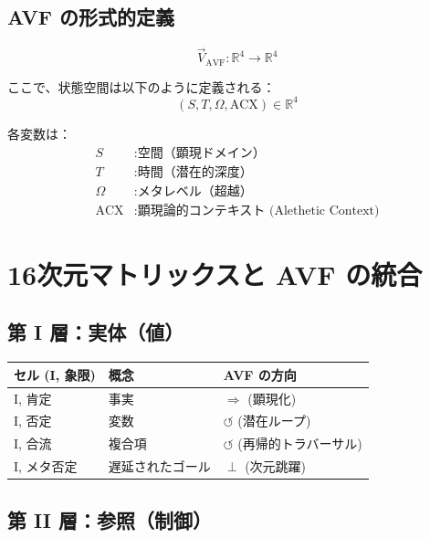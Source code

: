 \documentclass[12pt,a4paper]{ujarticle}
\begin{document}
\subsection{AVF の形式的定義}

\begin{equation}
\vec{V}_{\text{AVF}} : \mathbb{R}^4 \to \mathbb{R}^4
\end{equation}

ここで、状態空間は以下のように定義される：
\begin{equation}
(S, T, \Omega, \text{ACX}) \in \mathbb{R}^4
\end{equation}

各変数は：
\begin{align}
S &: \text{空間（顕現ドメイン）} \\
T &: \text{時間（潜在的深度）} \\
\Omega &: \text{メタレベル（超越）} \\
\text{ACX} &: \text{顕現論的コンテキスト (Alethetic Context)}
\end{align}

\section{16次元マトリックスと AVF の統合}

\subsection{第 I 層：実体（値）}

\begin{table}[h]
\centering
\small
\begin{tabular}{|l|l|l|}
\hline
\textbf{セル (I, 象限)} & \textbf{概念} & \textbf{AVF の方向} \\
\hline
I, 肯定 & 事実 & $\Rightarrow$ (顕現化) \\
I, 否定 & 変数 & $\circlearrowleft$ (潜在ループ) \\
I, 合流 & 複合項 & $\circlearrowleft$ (再帰的トラバーサル) \\
I, メタ否定 & 遅延されたゴール & $\perp$ (次元跳躍) \\
\hline
\end{tabular}
\end{table}

\subsection{第 II 層：参照（制御）}
\end{document}
